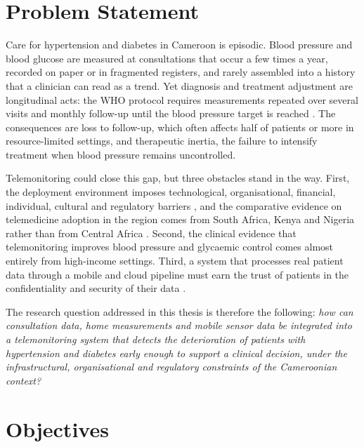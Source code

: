 \documentclass[12pt,a4paper,oneside]{report}
\begin{document}
\section{Problem Statement}\label{sec:intro-problem}\label{sec:scope-problem}

Care for hypertension and diabetes in Cameroon is episodic. Blood pressure and blood glucose are measured at consultations that occur a few times a year, recorded on paper or in fragmented registers, and rarely assembled into a history that a clinician can read as a trend. Yet diagnosis and treatment adjustment are longitudinal acts: the WHO protocol requires measurements repeated over several visits and monthly follow-up until the blood pressure target is reached \parencite{who2021guideline,who2023hypertension}. The consequences are loss to follow-up, which often affects half of patients or more in resource-limited settings, and therapeutic inertia, the failure to intensify treatment when blood pressure remains uncontrolled.

Telemonitoring could close this gap, but three obstacles stand in the way. First, the deployment environment imposes technological, organisational, financial, individual, cultural and regulatory barriers \parencite{dodoo2022}, and the comparative evidence on telemedicine adoption in the region comes from South Africa, Kenya and Nigeria rather than from Central Africa \parencite{agbeyangi2025}. Second, the clinical evidence that telemonitoring improves blood pressure and glycaemic control comes almost entirely from high-income settings. Third, a system that processes real patient data through a mobile and cloud pipeline must earn the trust of patients in the confidentiality and security of their data \parencite{alhammad2024}.

The research question addressed in this thesis is therefore the following: \emph{how can consultation data, home measurements and mobile sensor data be integrated into a telemonitoring system that detects the deterioration of patients with hypertension and diabetes early enough to support a clinical decision, under the infrastructural, organisational and regulatory constraints of the Cameroonian context?}

\section{Objectives}\label{sec:intro-objectives}
\end{document}
